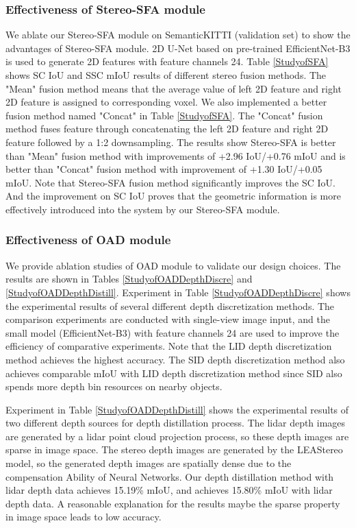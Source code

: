 \documentclass{article}
\begin{document}
	\subsubsection{Effectiveness of Stereo-SFA module}
	We ablate our Stereo-SFA module on SemanticKITTI (validation set) to show the advantages of Stereo-SFA module. 2D U-Net based on pre-trained EfficientNet-B3 \cite{pmlrv97tan19a} is used to generate 2D features with feature channels 24. Table \ref{StudyofSFA} shows SC IoU and SSC mIoU results of different stereo fusion methods. The "Mean" fusion method means that the average value of left 2D feature and right 2D feature is assigned to corresponding voxel. We also implemented a better fusion method named "Concat" in Table \ref{StudyofSFA}. The "Concat" fusion method fuses feature through concatenating the left 2D feature and right 2D feature followed by a 1:2 downsampling. The results show Stereo-SFA is better than "Mean" fusion method with improvements of +2.96 IoU/+0.76 mIoU and is better than "Concat" fusion method with improvement of +1.30 IoU/+0.05 mIoU. Note that Stereo-SFA fusion method significantly improves the SC IoU. And the improvement on SC IoU proves that the geometric information is more effectively introduced into the system by our Stereo-SFA module.
	
	
	\subsubsection{Effectiveness of OAD module}
	We provide ablation studies of OAD module to validate our design choices.
	The results are shown in Tables \ref{StudyofOADDepthDiscre} and \ref{StudyofOADDepthDistill}.
	Experiment in Table \ref{StudyofOADDepthDiscre} shows the experimental results of several different depth discretization methods.
	The comparison experiments are conducted with single-view image input, and the small model (EfficientNet-B3) with feature channels 24 are used to improve the efficiency of comparative experiments.
	Note that the LID depth discretization method achieves the highest accuracy. The SID depth discretization method also achieves comparable mIoU with LID depth discretization method since SID also spends more depth bin resources on nearby objects.
	
	Experiment in Table \ref{StudyofOADDepthDistill} shows the experimental results of two different depth sources for depth distillation process.
	The lidar depth images are generated by a lidar point cloud projection process, so these depth images are sparse in image space. The stereo depth images are generated by the LEAStereo model, so the generated depth images are spatially dense due to the compensation Ability of Neural Networks. Our depth distillation method with lidar depth data achieves 15.19\% mIoU, and achieves 15.80\% mIoU with lidar depth data. A reasonable explanation for the results maybe the sparse property in image space leads to low accuracy.
	
\end{document}
